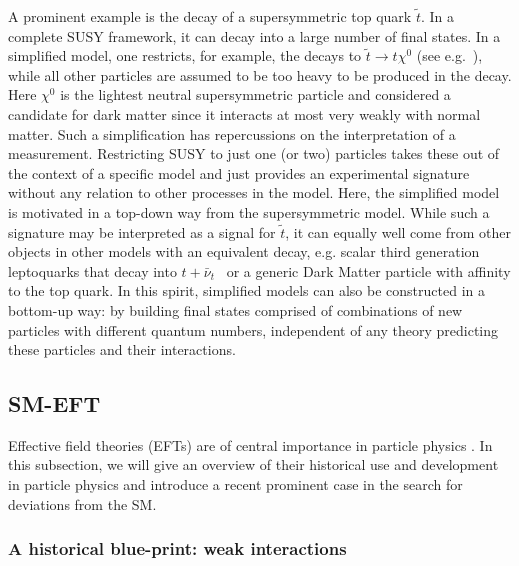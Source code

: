 A prominent example is the decay of a supersymmetric top quark
$\tilde{t}$. In a complete SUSY framework, it can decay into a large
number of final states.  In a simplified model, one restricts, for example, the
decays to $\tilde{t}\rightarrow t\chi^0$ (see e.g.~\cite{Aaboud:2017ayj}), while all other particles
are assumed to be too heavy to be produced in the decay.  
Here $\chi^0$ is the lightest neutral supersymmetric particle and considered a candidate for 
dark matter since it interacts at most very weakly with normal matter.  
Such a
simplification has repercussions on the interpretation of a
measurement.  Restricting SUSY to just one (or two) particles takes
these out of the context of a specific model and just provides an
experimental signature without any relation to other processes in the
model. Here, the simplified model is motivated in a top-down way from
the supersymmetric model. While such a signature may be interpreted as a signal for
$\tilde{t}$, it can equally well come from other objects in other
models with an equivalent decay, e.g. scalar third generation
leptoquarks that decay into $t+\bar{\nu}_t$~\citep{Aad:2015caa} or a generic Dark Matter particle with affinity to the
top quark. In this spirit, simplified models can also be constructed
in a bottom-up way: by building final states comprised of
combinations of new particles with different quantum numbers,
independent of any theory predicting these particles and their interactions.



\subsection{SM-EFT}

Effective field theories (EFTs) are of central importance in particle
physics \citep[see, e.g.,][]{Georgi:1994qn}. 
In this subsection, we will give an overview of their historical use and development in particle physics and introduce a recent prominent case in the search for deviations from the SM.


\subsubsection{A historical blue-print: weak interactions}
\label{ssec:Fermi}

